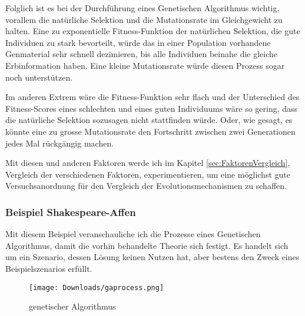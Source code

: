 \documentclass[11pt,a4paper,ngerman]{article}
\begin{document}
\bigskip
Folglich ist es bei der Durchführung eines Genetischen Algorithmus wichtig, vorallem die natürliche Selektion und die Mutationsrate im Gleichgewicht zu halten. Eine zu exponentielle Fitness-Funktion der natürlichen Selektion, die gute Individuen zu stark bevorteilt, würde das in einer Population vorhandene Genmaterial sehr schnell dezimieren, bis alle Individuen beinahe die gleiche Erbinformation haben. Eine kleine Mutationsrate würde diesen Prozess sogar noch unterstützen.

\bigskip
Im anderen Extrem wäre die Fitness-Funktion sehr flach und der Unterschied des Fitness-Scores eines schlechten und eines guten Individuums wäre so gering, dass die natürliche Selektion sozusagen nicht stattfinden würde. Oder, wie gesagt, es könnte eine zu grosse Mutationsrate den Fortschritt zwischen zwei Generationen jedes Mal rückgängig machen.

\bigskip
Mit diesen und anderen Faktoren werde ich im Kapitel \ref{sec:FaktorenVergleich}, Vergleich der verschiedenen Faktoren, experimentieren, um eine möglichst gute Versuchsanordnung für den Vergleich der Evolutionsmechanismen zu schaffen.

\subsubsection{Beispiel Shakespeare-Affen}

Mit diesem Beispiel veranschauliche ich die Prozesse eines Genetischen Algorithmus, damit die vorhin behandelte Theorie sich festigt. Es handelt sich um ein Szenario, dessen Lösung keinen Nutzen hat, aber bestens den Zweck eines Beispielszenarios erfüllt.

\bigskip
\begin{wrapfigure}[20]{l}{0.3\textwidth} 
    \vspace{-20pt}
        \begin{center}
            \texttt{[image: Downloads/gaprocess.png]}
            \caption{genetischer Algorithmus}
        \end{center}
    \vspace{-20pt}
\end{wrapfigure} 
\end{document}
